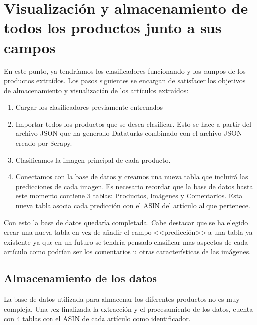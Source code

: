 
\section{Visualización y almacenamiento de todos los productos junto a sus campos}

En este punto, ya tendríamos los clasificadores funcionando y los campos de los productos extraídos. Los pasos siguientes se encargan de satisfacer los objetivos de almacenamiento y visualización de los artículos extraídos:

\begin{enumerate}
    \item Cargar los clasificadores previamente entrenados
    \item Importar todos los productos que se desea clasificar. Esto se hace a partir del archivo JSON que ha generado Dataturks combinado con el archivo JSON creado por Scrapy.
    \item Clasificamos la imagen  principal de cada producto.
    \item Conectamos con la base de datos y creamos una nueva tabla que incluirá las predicciones de cada imagen. Es necesario recordar que la base de datos hasta este momento contiene 3 tablas: Productos, Imágenes y Comentarios. Esta nueva tabla asocia cada predicción con el ASIN del artículo al que pertenece.
\end{enumerate}

Con esto la base de datos quedaría completada. Cabe destacar que se ha elegido crear una nueva tabla en vez de añadir el campo <<predicción>> a una tabla ya existente ya que en un futuro se tendría pensado clasificar mas aspectos de cada artículo como podrían ser los comentarios u otras características de las imágenes.

\subsection{Almacenamiento de los datos}

La base de datos utilizada para almacenar los diferentes productos no es muy compleja. Una vez finalizada la extracción y el procesamiento de los datos, cuenta con 4 tablas con el ASIN de cada artículo como identificador.

